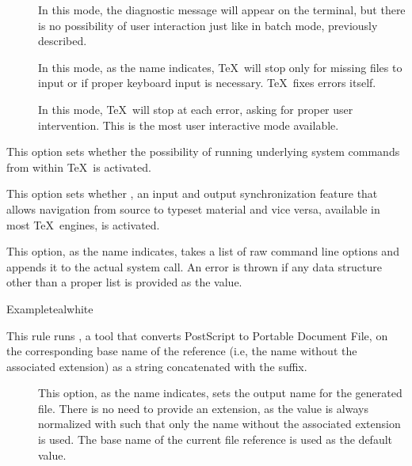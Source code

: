 \begin{description}
\begin{description}
\begin{description}
\item[] In this mode, the diagnostic message will appear on the terminal, but there is no possibility of user interaction just like in batch mode, previously described.

\item[] In this mode, as the name indicates, \TeX\ will stop only for missing files to input or if proper keyboard input is necessary. \TeX\ fixes errors itself.

\item[] In this mode, \TeX\ will stop at each error, asking for proper user intervention. This is the most user interactive mode available.
\end{description}

\item[\rpsbox{shell}] This option sets whether the possibility of running underlying system commands from within \TeX\ is activated.

\item[\rpsbox{synctex}] This option sets whether , an input and output synchronization feature that allows navigation from source to typeset material and vice versa, available in most \TeX\ engines, is activated.

\item[\abox{options}] This option, as the name indicates, takes a list of raw command line options and appends it to the actual system call. An error is thrown if any data structure other than a proper list is provided as the value.
\end{description}

\begin{codebox}{Example}{teal}{\icnote}{white}
\end{codebox}

\item[\rulebox{ps2pdf}]
This rule runs , a tool that converts PostScript to Portable Document File, on the corresponding base name of the  reference (i.e, the name without the associated extension) as a string concatenated with the  suffix.

\begin{description}
\item[] This option, as the name indicates, sets the output name for the generated  file. There is no need to provide an extension, as the value is always normalized with  such that only the name without the associated extension is used. The base name of the current file reference is used as the default value.


\end{description}
\end{description}
